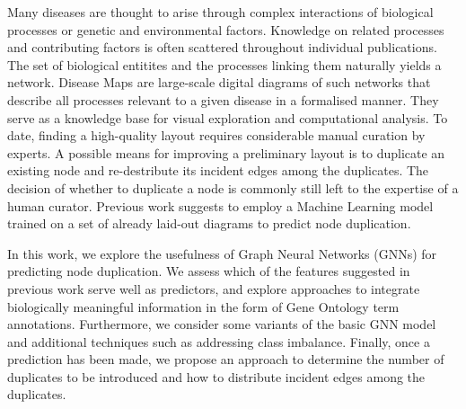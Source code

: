 \documentclass[
	fontsize=10pt, %
	twoside=false, %
	secnumdepth=1, %
  toc=indentunnumbered %
]{kaobook}
\begin{document}
Many diseases are thought to arise through complex interactions of biological
processes or genetic and environmental factors.
Knowledge on related processes and contributing factors
is often scattered throughout individual publications.
%
The set of biological entitites and the processes linking them naturally yields
a network.
Disease Maps are large-scale digital diagrams of such networks that
describe all processes relevant to a given disease in a formalised manner.
They serve as a
knowledge base for visual exploration and computational analysis.
%
To date, finding a high-quality layout requires considerable manual
curation by experts.
A possible means for improving a preliminary layout is to duplicate an
existing node and re-destribute its incident edges among the duplicates.
The decision of whether to duplicate a node is commonly still left to the
expertise of a human curator. Previous work
suggests to employ a Machine Learning
model trained on a set of already laid-out diagrams to predict node duplication.

In this work, we explore the usefulness of Graph Neural Networks (GNNs) for
predicting node duplication.
%
We assess which
of the features suggested in previous work
serve well as predictors,
%
and explore approaches to integrate biologically meaningful information in the
form of Gene Ontology term annotations.
%
Furthermore, we consider some variants of the basic GNN model and
additional techniques such as addressing class imbalance.
%
Finally, once a prediction has been made, we propose an approach to determine
the number of duplicates to be introduced and how to distribute incident edges
among the duplicates.
\end{document}
